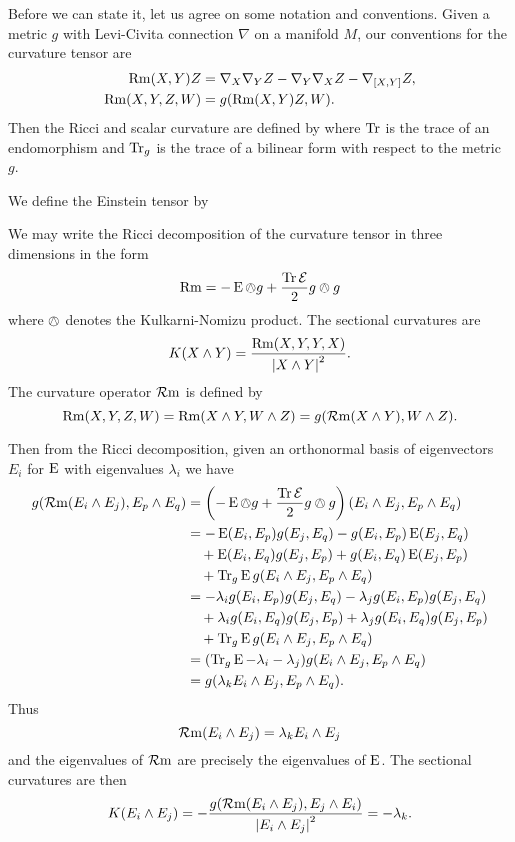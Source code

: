 \documentclass[a4paper,12pt]{amsart}
\begin{document}
Before we can state it, let us agree on some notation and conventions. Given a metric \(g\) with Levi-Civita connection $\nabla$ on a manifold $M$, our conventions for the curvature tensor are
\[
\begin{split}
\operatorname{Rm}(X, Y) Z &= \nabla_X \nabla_Y Z - \nabla_Y \nabla_X Z - \nabla_{[X, Y]} Z, \\
\operatorname{Rm}(X, Y, Z, W) &= g(\operatorname{Rm}(X, Y) Z, W).
\end{split}
\]
Then the Ricci and scalar curvature are defined by
where $\operatorname{Tr}$ is the trace of an endomorphism and $\operatorname{Tr}_{g}$ is the trace of a bilinear form with respect to the metric $g$.

We define the Einstein tensor by

We may write the Ricci decomposition of the curvature tensor in three dimensions in the form
\[
\operatorname{Rm} = -\operatorname{E} \owedge g + \frac{\operatorname{Tr} \operatorname{\mathcal{E}}}{2} g \owedge g
\]
where \(\owedge\) denotes the Kulkarni-Nomizu product. The sectional curvatures are
\[
K(X \wedge Y) = \frac{\operatorname{Rm}(X, Y, Y, X)}{\left\lvert{X \wedge Y}\right\rvert^2}.
\]
The curvature operator \(\operatorname{\mathcal{R}m}\) is defined by
\[
\operatorname{Rm}(X, Y, Z, W) = \operatorname{Rm}(X \wedge Y, W \wedge Z) = g(\operatorname{\mathcal{R}m}(X \wedge Y), W \wedge Z).
\]

Then from the Ricci decomposition, given an orthonormal basis of eigenvectors \(E_i\) for \(\operatorname{E}\) with eigenvalues \(\lambda_i\) we have
\[
\begin{split}
g(\operatorname{\mathcal{R}m}(E_i \wedge E_j), E_p \wedge E_q) &= \left(-\operatorname{E} \owedge g + \frac{\operatorname{Tr} \operatorname{\mathcal{E}}}{2} g \owedge g\right) (E_i \wedge E_j, E_p \wedge E_q) \\
&= - \operatorname{E}(E_i, E_p) g(E_j, E_q) - g(E_i, E_p) \operatorname{E}(E_j, E_q) \\
&\quad + \operatorname{E}(E_i, E_q) g(E_j, E_p) + g(E_i, E_q) \operatorname{E}(E_j, E_p) \\
&\quad + \operatorname{Tr}_g \operatorname{E} g(E_i \wedge E_j, E_p \wedge E_q) \\
&= - \lambda_i g(E_i, E_p) g(E_j, E_q) - \lambda_j g(E_i, E_p) g(E_j, E_q) \\
&\quad + \lambda_i g(E_i, E_q) g(E_j, E_p) + \lambda_j g(E_i, E_q) g(E_j, E_p) \\
&\quad + \operatorname{Tr}_g \operatorname{E} g(E_i \wedge E_j, E_p \wedge E_q) \\
&= (\operatorname{Tr}_g \operatorname{E} - \lambda_i - \lambda_j) g(E_i \wedge E_j, E_p \wedge E_q) \\
&= g(\lambda_k E_i \wedge E_j, E_p \wedge E_q).
\end{split}
\]
Thus
\[
\operatorname{\mathcal{R}m}(E_i \wedge E_j) = \lambda_k E_i \wedge E_j
\]
and the eigenvalues of \(\operatorname{\mathcal{R}m}\) are precisely the eigenvalues of \(\operatorname{E}\). The sectional curvatures are then
\begin{equation}
\label{eq:sectional}
K (E_i \wedge E_j) = -\frac{g(\operatorname{\mathcal{R}m}(E_i \wedge E_j), E_j \wedge E_i)}{\left\lvert{E_i \wedge E_j}\right\rvert^2} = -\lambda_k.
\end{equation}
\end{document}
